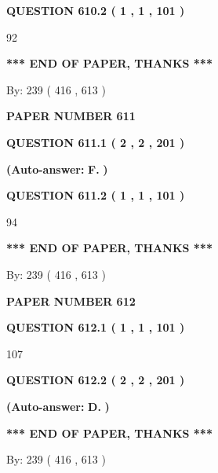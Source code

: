 \documentclass[12pt]{article}
\begin{document}
  
{\textbf{\large{QUESTION
610.2 
 ( 1 , 1 , 101 )
}}}

92
   
   
   
   
\vspace{1.0in} 
{\textbf{\large{ *** END OF PAPER, THANKS *** }}} 
   
   
\hspace{1.0in} By: 
 239 ( 416 ,  613 )
   
   
   
   
\newpage 
\setcounter{page}{ 
   611001 } 
   
   
 {\textbf{ \Large{ PAPER NUMBER  611  }}}
   
   
   
   
  
  
{\textbf{\large{QUESTION
611.1 
 ( 2 , 2 , 201 )
}}}
 
 
{\textbf{(Auto-answer:}}
{\textbf{\large{
F.}}}
{\textbf{)}}
 
 
  
  
{\textbf{\large{QUESTION
611.2 
 ( 1 , 1 , 101 )
}}}

94
   
   
   
   
\vspace{1.0in} 
{\textbf{\large{ *** END OF PAPER, THANKS *** }}} 
   
   
\hspace{1.0in} By: 
 239 ( 416 ,  613 )
   
   
   
   
\newpage 
\setcounter{page}{ 
   612001 } 
   
   
 {\textbf{ \Large{ PAPER NUMBER  612  }}}
   
   
   
   
  
  
{\textbf{\large{QUESTION
612.1 
 ( 1 , 1 , 101 )
}}}

107
  
  
{\textbf{\large{QUESTION
612.2 
 ( 2 , 2 , 201 )
}}}
 
 
{\textbf{(Auto-answer:}}
{\textbf{\large{
D.}}}
{\textbf{)}}
 
 
   
   
   
   
\vspace{1.0in} 
{\textbf{\large{ *** END OF PAPER, THANKS *** }}} 
   
   
\hspace{1.0in} By: 
 239 ( 416 ,  613 )
   
   
   
\end{document}
